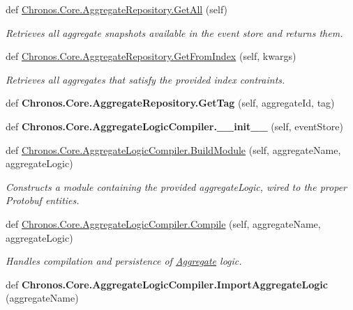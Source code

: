 \begin{DoxyCompactItemize}
\item 
def \hyperlink{group__Chronos_gac9cde7c90df6d8e1d0c0166cfa87358c}{Chronos.\+Core.\+Aggregate\+Repository.\+Get\+All} (self)
\begin{DoxyCompactList}\small\item\em Retrieves all aggregate snapshots available in the event store and returns them. \end{DoxyCompactList}\item 
def \hyperlink{group__Chronos_ga4abb70024e82d3dca4f92c634bdc4bfd}{Chronos.\+Core.\+Aggregate\+Repository.\+Get\+From\+Index} (self, kwargs)
\begin{DoxyCompactList}\small\item\em Retrieves all aggregates that satisfy the provided index contraints. \end{DoxyCompactList}\item 
def {\bfseries Chronos.\+Core.\+Aggregate\+Repository.\+Get\+Tag} (self, aggregate\+Id, tag)\hypertarget{group__Chronos_ga4ccd3b4dab5870aacce2453a7bf19ed6}{}\label{group__Chronos_ga4ccd3b4dab5870aacce2453a7bf19ed6}

\item 
def {\bfseries Chronos.\+Core.\+Aggregate\+Logic\+Compiler.\+\_\+\+\_\+init\+\_\+\+\_\+} (self, event\+Store)\hypertarget{group__Chronos_ga0ac6fb43a7d6b90e1b81c79cc9642f38}{}\label{group__Chronos_ga0ac6fb43a7d6b90e1b81c79cc9642f38}

\item 
def \hyperlink{group__Chronos_ga751fbece3b09db34133314bfde9052f6}{Chronos.\+Core.\+Aggregate\+Logic\+Compiler.\+Build\+Module} (self, aggregate\+Name, aggregate\+Logic)
\begin{DoxyCompactList}\small\item\em Constructs a module containing the provided aggregate\+Logic, wired to the proper Protobuf entities. \end{DoxyCompactList}\item 
def \hyperlink{group__Chronos_ga5c8b8498a50aa6157dbf12c35c09748f}{Chronos.\+Core.\+Aggregate\+Logic\+Compiler.\+Compile} (self, aggregate\+Name, aggregate\+Logic)
\begin{DoxyCompactList}\small\item\em Handles compilation and persistence of \hyperlink{classChronos_1_1Core_1_1Aggregate}{Aggregate} logic. \end{DoxyCompactList}\item 
def {\bfseries Chronos.\+Core.\+Aggregate\+Logic\+Compiler.\+Import\+Aggregate\+Logic} (aggregate\+Name)\hypertarget{group__Chronos_ga80ad199ce30b89b02500a24606909a5a}{}\label{group__Chronos_ga80ad199ce30b89b02500a24606909a5a}


\end{DoxyCompactItemize}
